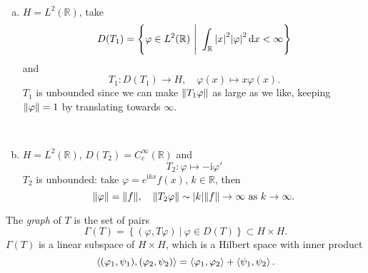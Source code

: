 \documentclass[a4paper,11pt]{article}
\begin{document}
	\begin{ex}
		\ 
		\begin{enumerate}[a)]
			\item $H = L^2(\mathbb{R})$, take \[
				D(T_1) = \left\{ \varphi \in L^2(\mathbb{R})\ \Bigg|\ \int _{\mathbb{R}} \abs{x}^2 \abs{\varphi}^2 \dd{x} < \infty \right\}
			\]
			and 
			\[
				T_1 : D(T_1) \to H, \quad \varphi(x) \mapsto x \varphi(x).
			\]
			$T_1$ is unbounded since we can make $\norm{T_1 \varphi}$ as large as we like, keeping $\norm{\varphi} = 1$ by translating towards $\infty$.
			\begin{center}
				~%
			\end{center}
			\item $H = L^2(\mathbb{R})$, $D(T_2) = C ^{\infty}_c(\mathbb{R})$ and 
			\[
				T_2 : \varphi \mapsto - \mathrm{i} \varphi'
			\]
			$T_2$ is unbounded: take $\varphi = e ^{\mathrm{i} k x} f (x)$, $k \in \mathbb{R}$, then 
			\[
				\norm{\varphi} = \norm{f}, \quad \norm{T_2 \varphi} \sim \abs{k} \norm{f} \to \infty \text{ as } k \to \infty.
			\]
		\end{enumerate}
	\end{ex}

	The \emph{graph} of $T$ is the set of pairs 
	\[
		\Gamma(T) = \left\{ (\varphi, T \varphi)\ |\ \varphi \in D(T) \right\} \subset H \times H.
	\]
	$\Gamma(T)$ is a linear subspace of $H \times H$, which is a Hilbert space with inner product 
	\[
		\expval{(\varphi_1, \psi_1), (\varphi_2, \psi_2)} = \expval{\varphi_1, \varphi_2} + \expval{\psi_1, \psi_2}.
	\]
\end{document}
